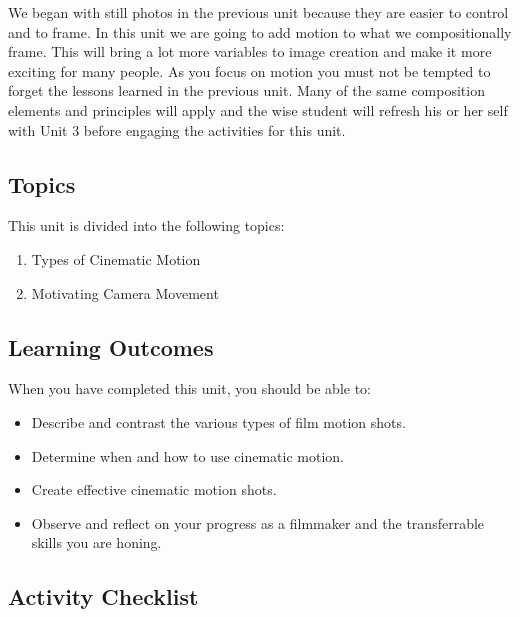 \documentclass[
]{book}
\providecommand{\tightlist}{%
  \setlength{\itemsep}{0pt}\setlength{\parskip}{0pt}}
\begin{document}
We began with still photos in the previous unit because they are easier to control and to frame. In this unit we are going to add motion to what we compositionally frame. This will bring a lot more variables to image creation and make it more exciting for many people. As you focus on motion you must not be tempted to forget the lessons learned in the previous unit. Many of the same composition elements and principles will apply and the wise student will refresh his or her self with Unit 3 before engaging the activities for this unit.

\hypertarget{topics-3}{%
\subsection*{Topics}\label{topics-3}}

This unit is divided into the following topics:

\begin{enumerate}
\def\labelenumi{\arabic{enumi}.}
\tightlist
\item
  Types of Cinematic Motion\\
\item
  Motivating Camera Movement
\end{enumerate}

\hypertarget{learning-outcomes-3}{%
\subsection*{Learning Outcomes}\label{learning-outcomes-3}}

When you have completed this unit, you should be able to:

\begin{itemize}
\tightlist
\item
  Describe and contrast the various types of film motion shots.\\
\item
  Determine when and how to use cinematic motion.\\
\item
  Create effective cinematic motion shots.\\
\item
  Observe and reflect on your progress as a filmmaker and the transferrable skills you are honing.
\end{itemize}

\hypertarget{activity-checklist-3}{%
\subsection*{Activity Checklist}\label{activity-checklist-3}}
\end{document}
